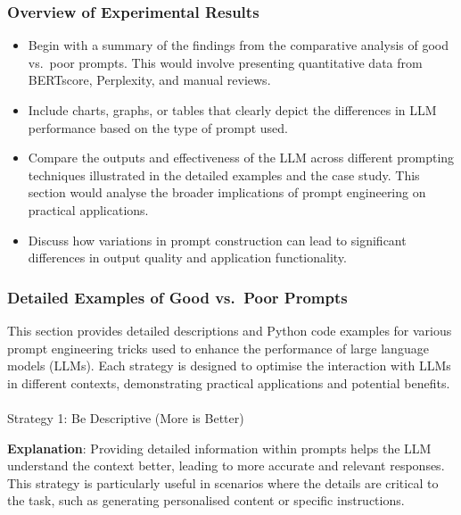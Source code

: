 \documentclass[
]{agujournal2019}
\makeatletter
\let\oldparagraph\paragraph
\renewcommand{\paragraph}{
    \@ifstar
      \xxxParagraphStar
      \xxxParagraphNoStar
  }
\newcommand{\xxxParagraphStar}[1]{\oldparagraph*{#1}\mbox{}}
\newcommand{\xxxParagraphNoStar}[1]{\oldparagraph{#1}\mbox{}}
\providecommand{\tightlist}{%
  \setlength{\itemsep}{0pt}\setlength{\parskip}{0pt}}\usepackage{longtable,booktabs,array}
\makeatother
\begin{document}
\subsubsection{Overview of Experimental
Results}\label{overview-of-experimental-results}

\begin{itemize}
\tightlist
\item
  Begin with a summary of the findings from the comparative analysis of
  good vs.~poor prompts. This would involve presenting quantitative data
  from BERTscore, Perplexity, and manual reviews.
\item
  Include charts, graphs, or tables that clearly depict the differences
  in LLM performance based on the type of prompt used.
\item
  Compare the outputs and effectiveness of the LLM across different
  prompting techniques illustrated in the detailed examples and the case
  study. This section would analyse the broader implications of prompt
  engineering on practical applications.
\item
  Discuss how variations in prompt construction can lead to significant
  differences in output quality and application functionality.
\end{itemize}

\subsubsection{Detailed Examples of Good vs.~Poor
Prompts}\label{detailed-examples-of-good-vs.-poor-prompts}

This section provides detailed descriptions and Python code examples for
various prompt engineering tricks used to enhance the performance of
large language models (LLMs). Each strategy is designed to optimise the
interaction with LLMs in different contexts, demonstrating practical
applications and potential benefits.

\paragraph{Strategy 1: Be Descriptive (More is
Better)}\label{strategy-1-be-descriptive-more-is-better}

\textbf{Explanation}: Providing detailed information within prompts
helps the LLM understand the context better, leading to more accurate
and relevant responses. This strategy is particularly useful in
scenarios where the details are critical to the task, such as generating
personalised content or specific instructions.
\end{document}
